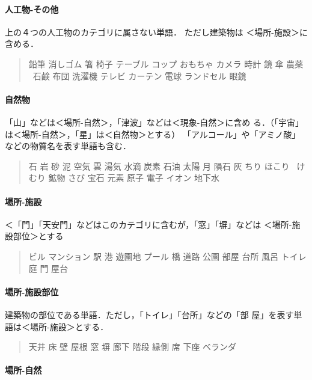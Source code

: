 \documentclass[a4j,titlepage]{jarticle}
\begin{document}
\paragraph{人工物-その他}

上の４つの人工物のカテゴリに属さない単語． ただし建築物は
＜場所-施設＞に含める．

\begin{quote}
鉛筆 消しゴム 箸 椅子 テーブル コップ おもちゃ カメラ 時計 鏡 傘 農薬 
\ 石鹸 布団 洗濯機 テレビ カーテン 電球 ランドセル 眼鏡
\end{quote}


\paragraph{自然物}

「山」などは＜場所-自然＞，「津波」などは＜現象-自然＞に含め
る．（「宇宙」は＜場所-自然＞，「星」は＜自然物＞とする）
「アルコール」や「アミノ酸」などの物質名を表す単語も含む．

\begin{quote}
石 岩 砂 泥 空気 雲 湯気 水滴 炭素 石油 太陽 月 隕石 灰 ちり ほこり 
\ けむり 鉱物 さび 宝石 元素 原子 電子 イオン 地下水
\end{quote}


\paragraph{場所-施設}

＜「門」「天安門」などはこのカテゴリに含むが，「窓」「塀」などは
＜場所-施設部位＞とする

\begin{quote}
ビル マンション 駅 港 遊園地 プール 橋 道路 公園 部屋 台所 風呂 トイレ 庭 門 屋台
\end{quote}


\paragraph{場所-施設部位}

建築物の部位である単語．ただし，「トイレ」「台所」などの「部
屋」を表す単語は＜場所-施設＞とする．

\begin{quote}
天井 床 壁 屋根 窓 塀 廊下 階段 縁側 席 下座 ベランダ
\end{quote}


\paragraph{場所-自然}
\end{document}
